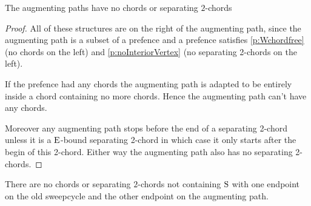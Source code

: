     \begin{lemma}
      The augmenting paths have no chords or separating $2$-chords
      \label{lm:sweep:augNoIregularity}
    \end{lemma}
    \begin{proof}
        All of these structures are on the right of the augmenting path, since the augmenting path is a subset of a prefence and a  prefence satisfies \ref{p:Wchordfree} (no chords on the left) and \ref{p:noInteriorVertex} (no separating 2-chords on the left).

        If the prefence had any chords the augmenting path is adapted to be entirely inside a chord containing no more chords. Hence the augmenting path can't have any chords.

        Moreover any augmenting path stops before the end of a separating 2-chord unless it is a $\mathrm{E}$-bound separating 2-chord in which case it only starts after the begin of this 2-chord. Either way the augmenting path also has no separating 2-chords.
    \end{proof}

    \begin{lemma}
      \label{lm:sweep:noConnectingIregularity}
      There are no chords or separating $2$-chords not containing $\mathrm{S}$ with one endpoint on the old sweepcycle and the other endpoint on the augmenting path.
    \end{lemma}


